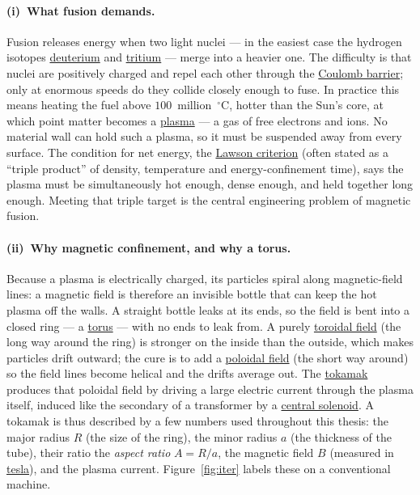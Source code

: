 \documentclass[11pt]{article}
\newcommand{\jl}[2]{\href{#2}{#1}}
\begin{document}
\paragraph{(i)~What fusion demands.}
Fusion releases energy when two light nuclei --- in the easiest case the hydrogen isotopes \jl{deuterium}{https://en.wikipedia.org/wiki/Deuterium} and \jl{tritium}{https://en.wikipedia.org/wiki/Tritium} --- merge into a heavier one. The difficulty is that nuclei are positively charged and repel each other through the \jl{Coulomb barrier}{https://en.wikipedia.org/wiki/Coulomb_barrier}; only at enormous speeds do they collide closely enough to fuse. In practice this means heating the fuel above $100$~million~$^\circ$C, hotter than the Sun's core, at which point matter becomes a \jl{plasma}{https://en.wikipedia.org/wiki/Plasma_(physics)} --- a gas of free electrons and ions.\cite{freidberg,wesson} No material wall can hold such a plasma, so it must be suspended away from every surface. The condition for net energy, the \jl{Lawson criterion}{https://en.wikipedia.org/wiki/Lawson_criterion} (often stated as a ``triple product'' of density, temperature and energy-confinement time), says the plasma must be simultaneously hot enough, dense enough, and held together long enough.\cite{lawson1957} Meeting that triple target is the central engineering problem of magnetic fusion.

\paragraph{(ii)~Why magnetic confinement, and why a torus.}
Because a plasma is electrically charged, its particles spiral along magnetic-field lines: a magnetic field is therefore an invisible bottle that can keep the hot plasma off the walls.\cite{freidberg} A straight bottle leaks at its ends, so the field is bent into a closed ring --- a \jl{torus}{https://en.wikipedia.org/wiki/Torus} --- with no ends to leak from. A purely \jl{toroidal field}{https://www.energyencyclopedia.com/en/nuclear-fusion/tokamaks/toroidal-field} (the long way around the ring) is stronger on the inside than the outside, which makes particles drift outward; the cure is to add a \jl{poloidal field}{https://www.energyencyclopedia.com/en/nuclear-fusion/tokamaks/poloidal-field} (the short way around) so the field lines become helical and the drifts average out. The \jl{tokamak}{https://www.energyencyclopedia.com/en/nuclear-fusion/tokamaks} produces that poloidal field by driving a large electric current through the plasma itself, induced like the secondary of a transformer by a \jl{central solenoid}{https://www.energyencyclopedia.com/en/nuclear-fusion/tokamaks/central-solenoid}. A tokamak is thus described by a few numbers used throughout this thesis: the major radius $R$ (the size of the ring), the minor radius $a$ (the thickness of the tube), their ratio the \emph{aspect ratio} $A=R/a$, the magnetic field $B$ (measured in \jl{tesla}{https://en.wikipedia.org/wiki/Tesla_(unit)}), and the plasma current. Figure~\ref{fig:iter} labels these on a conventional machine.
\end{document}
